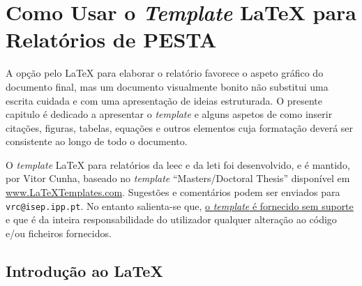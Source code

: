 
\chapter{Como Usar o \textit{Template} \LaTeX{} para Relatórios de PESTA}	%
\label{Chapter2}	%


A opção pelo \LaTeX{} para elaborar o relatório favorece o aspeto gráfico do documento final, mas um documento visualmente bonito não substitui uma escrita cuidada e com uma apresentação de ideias estruturada. O presente capitulo é dedicado a apresentar o \textit{template} e alguns aspetos de como inserir citações, figuras, tabelas, equações e outros elementos cuja formatação deverá ser consistente ao longo de todo o documento.

O \textit{template} \LaTeX{} para relatórios da \ac{leec} e da \ac{leti} foi desenvolvido, e é mantido, por Vitor Cunha, baseado no \textit{template} ``Masters/Doctoral Thesis'' disponível em \url{www.LaTeXTemplates.com}. Sugestões e comentários podem ser enviados para \verb|vrc@isep.ipp.pt|. No entanto salienta-se que, \underline{o \textit{template} é fornecido sem suporte} e que é da inteira responsabilidade do utilizador qualquer alteração ao código e/ou ficheiros fornecidos.

\begin{comment}
The comment environment is used to easily comment large sections of LateX code. The comment environment is used to easily comment large sections of LateX code. The comment environment is used to easily comment large sections of LateX code. The comment environment is used to easily comment large sections of LateX code. The comment environment is used to easily comment large sections of LateX code.
\end{comment}


\section{Introdução ao \LaTeX{}}
\label{sec:Ch2.1}

